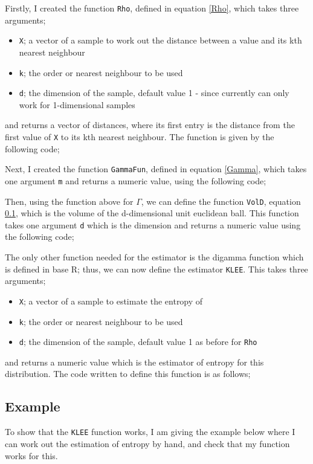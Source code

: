 \documentclass{report}
\begin{document}
Firstly, I created the function \texttt{Rho}, defined in equation \ref{Rho}, which takes three arguments;
\begin{itemize}
\item \texttt{X}; a vector of a sample to work out the distance between a value and its kth nearest neighbour
\item \texttt{k}; the order or nearest neighbour to be used
\item \texttt{d}; the dimension of the sample, default value 1 - since currently can only work for 1-dimensional samples
\end{itemize}
and returns a vector of distances, where its first entry is the distance from the first value of \texttt{X} to its kth nearest neighbour. The function is given by the following code;


Next, I created the function \texttt{GammaFun}, defined in equation \ref{Gamma}, which takes one argument \texttt{m} and returns a numeric value, using the following code;


Then, using the function above for $\Gamma$, we can define the function \texttt{VolD}, equation \ref{}, which is the volume of the d-dimensional unit euclidean ball. This function takes one argument \texttt{d} which is the dimension and returns a numeric value using the following code;


The only other function needed for the estimator is the digamma function which is defined in base R; thus, we can now define the estimator \texttt{KLEE}. This takes three arguments;
\begin{itemize}
\item \texttt{X}; a vector of a sample to estimate the entropy of
\item \texttt{k}; the order or nearest neighbour to be used
\item \texttt{d}; the dimension of the sample, default value 1 as before for \texttt{Rho}
\end{itemize}
and returns a numeric value which is the estimator of entropy for this distribution. The code written to define this function is as follows;



\subsection{Example}
To show that the \texttt{KLEE} function works, I am giving the example below where I can work out the estimation of entropy by hand, and check that my function works for this. 
\end{document}

